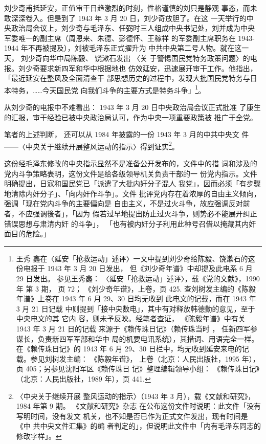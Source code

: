 刘少奇甫抵延安，正值审干日趋激烈的时刻，性格谨慎的刘只是静观 事态，而未
敢深深卷入。但是到了 1943 年 3 月 20 日，刘少奇放胆了。在这 一天举行的中
央政治局会议上，刘少奇与毛泽东、任弼时三人组成中央书记处，刘并成为中央
军委唯一的副主席（周恩来、朱德、彭德怀、王稼祥 的军委副主席职务在
1943-1944 年不再被提及），刘被毛泽东正式擢升为 中共中央第二号人物。就在这一
天， 刘少奇向华中局陈毅、 饶漱石发出 〈关 于警惕国民党特务政策问题〉的电
报。刘少奇要求新四军和华中根据地也 仿效延安，迅速展开审干工作。他指出，
「最近延安在整风及全面清查干 部思想历史的过程中，发现大批国民党特务与日
本特务，……今天国民党 向我们斗争的主要方式是特务斗争」\footnote{王秀
鑫在〈延安「抢救运动」述评〉一文中提到刘少奇给陈毅、饶漱石的这份电报于
1943 年 3 月 20 日发出， 但《刘少奇年谱》中却提及此电系 6 月 29 日发出。
参见王秀鑫： 〈延安「抢救运动」述评〉，载《党的文献》，1990 年 第 3 期，
页 72； 《刘少奇年谱》，上卷，页 425. 查刘树发主编的《陈毅年谱》上卷在
1943 年 6 月 29、30 日均无收到 此电文的记载，而在 1943 年 3 月 21 日记载
中则提到「接中央数电」，其中有对释放韩德勤的意见，至于中央电文的其 它内
容，则未予反映。经笔者查证， 《陈毅年谱》中有关 1943 年 3 月 21 日的记载
来源于《赖传珠日记》（赖传珠当时 ， 任新四军参谋长，负责新四军军部和华中
局的机要电讯系统），其措词、用语完全一样。在《赖传珠日记》的 1943 年 6
月 29、30 日栏中，均无收到延安来电的记载。参见刘树发主编： 《陈毅年谱》，
上卷（北京：人民出版社，1995 年）， 页 405；另参见沈阳军区《赖传珠日
记》整理编辑领导小组： 《赖传珠日记》（北京：人民出版社，1989 年），页
441.  }。

从刘少奇的电报中不难看出：
1943 年 3 月 20 日中央政治局会议正式批准
了康生的汇报，审干经验已被中央政治局认可，作为中央一项重要政策被
推广于全党。

笔者的上述判断， 还可以从 1984 年披露的一份 1943 年 3 月的中共中央文 件
——〈中央关于继续开展整风运动的指示〉得到证实\footnote{〈中央关于继续开展
整风运动的指示〉（1943 年 3 月），载《文献和研究》，1984 年第 9 期。
《文献和研究》杂志 在公布这份文件时说明：此文件「没有写明时间，没有发文
机关，也不知是否已作为正式文件发出，现有时间是《中 共中央文件汇集》的编
者判定的」，但说明此文件中「内有毛泽东同志的修改字样」。}。

这份经毛泽东修改的中央指示显然不是准备公开发布的，文件中的措
词和涉及的党内斗争策略表明，这份文件是给各级领导机关负责干部的一
份党内指示。文件明确提出，日寇和国民党已「派遣了大批内奸分子混人
我党」，因而必须「有步骤地清除内奸分子」、「向内奸作斗争」。文件
批评党内存在着浓厚的自由主义倾向，强调「现在党内斗争的主要偏向是
自由主义，不是过火斗争，故应强调反对前者，不应强调後者」，「因为
假若过早地提出防止过火斗争，则势必不能展开纠正错误思想与肃清内奸
的斗争」，
「也有被内奸分子利用此种号召借以掩藏其内奸面目的危险。」

